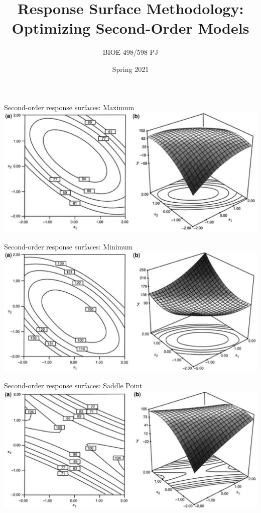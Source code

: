 \documentclass[10pt]{beamer}
\title{Response Surface Methodology:\\Optimizing Second-Order Models}
\author{BIOE 498/598 PJ}
\date{Spring 2021}
\begin{document}
\frame{\titlepage}

\begin{frame}{Second-order response surfaces: Maximum}
	\includegraphics[width=\textwidth]{figures/rsm_maximum}
\end{frame}

\begin{frame}{Second-order response surfaces: Minimum}
	\includegraphics[width=\textwidth]{figures/rsm_minimum}
\end{frame}

\begin{frame}{Second-order response surfaces: Saddle Point}
	\includegraphics[width=\textwidth]{figures/rsm_saddle}
\end{frame}
\end{document}
